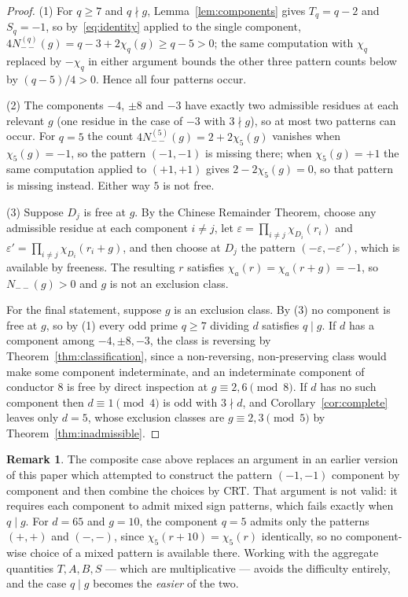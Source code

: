 \documentclass[11pt,reqno]{amsart}
\theoremstyle{plain}
\theoremstyle{definition}
\newtheorem{remark}[theorem]{Remark}
\begin{document}
\begin{proof}
(1) For $q \ge 7$ and $q \nmid g$, Lemma~\ref{lem:components} gives
$T_q = q - 2$ and $S_q = -1$, so by~\eqref{eq:identity} applied to the single
component, $4 N^{(q)}_{--}(g) = q - 3 + 2\chi_q(g) \ge q - 5 > 0$; the same
computation with $\chi_q$ replaced by $-\chi_q$ in either argument bounds the
other three pattern counts below by $(q-5)/4 > 0$. Hence all four patterns
occur.

(2) The components $-4$, $\pm 8$ and $-3$ have exactly two admissible residues
at each relevant $g$ (one residue in the case of $-3$ with $3 \nmid g$), so at
most two patterns can occur. For $q = 5$ the count
$4N^{(5)}_{--}(g) = 2 + 2\chi_5(g)$ vanishes when $\chi_5(g) = -1$, so the
pattern $(-1,-1)$ is missing there; when $\chi_5(g) = +1$ the same computation
applied to $(+1,+1)$ gives $2 - 2\chi_5(g) = 0$, so that pattern is missing
instead. Either way $5$ is not free.

(3) Suppose $D_j$ is free at $g$. By the Chinese Remainder Theorem, choose any
admissible residue at each component $i \neq j$, let
$\varepsilon = \prod_{i \neq j} \chi_{D_i}(r_i)$ and
$\varepsilon' = \prod_{i \neq j} \chi_{D_i}(r_i + g)$, and then choose at $D_j$
the pattern $(-\varepsilon, -\varepsilon')$, which is available by freeness.
The resulting $r$ satisfies $\chi_a(r) = \chi_a(r+g) = -1$, so
$N_{--}(g) > 0$ and $g$ is not an exclusion class.

For the final statement, suppose $g$ is an exclusion class. By (3) no component
is free at $g$, so by (1) every odd prime $q \ge 7$ dividing $d$ satisfies
$q \mid g$. If $d$ has a component among $-4, \pm 8, -3$, the class is
reversing by Theorem~\ref{thm:classification}, since a non-reversing,
non-preserving class would make some component indeterminate, and an
indeterminate component of conductor $8$ is free by direct inspection at
$g \equiv 2, 6 \pmod 8$. If $d$ has no such component then $d \equiv 1 \pmod 4$
is odd with $3 \nmid d$, and Corollary~\ref{cor:complete} leaves only $d = 5$,
whose exclusion classes are $g \equiv 2, 3 \pmod 5$ by
Theorem~\ref{thm:inadmissible}.
\end{proof}

\begin{remark}
\label{rem:oldproof}
The composite case above replaces an argument in an earlier version of this
paper which attempted to construct the pattern $(-1,-1)$ component by
component and then combine the choices by CRT. That argument is not valid: it
requires each component to admit mixed sign patterns, which fails exactly when
$q \mid g$. For $d = 65$ and $g = 10$, the component $q = 5$ admits only the
patterns $(+,+)$ and $(-,-)$, since $\chi_5(r+10) = \chi_5(r)$ identically, so
no component-wise choice of a mixed pattern is available there. Working with
the aggregate quantities $T, A, B, S$ --- which are multiplicative --- avoids
the difficulty entirely, and the case $q \mid g$ becomes the \emph{easier} of
the two.
\end{remark}
\end{document}
